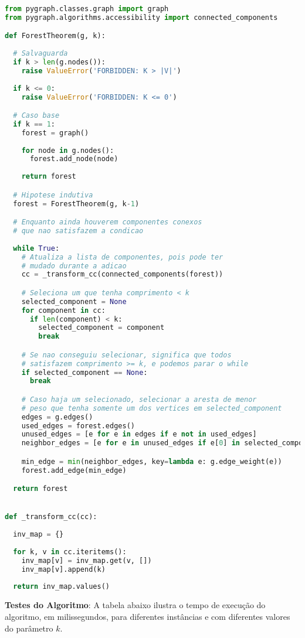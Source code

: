 \documentclass[paper=a4, fontsize=11pt]{scrartcl} %
\numberwithin{equation}{section} %
\numberwithin{figure}{section} %
\numberwithin{table}{section} %
\begin{document}
\begin{lstlisting}[language=Python, caption=Python algorithm]
from pygraph.classes.graph import graph
from pygraph.algorithms.accessibility import connected_components

def ForestTheorem(g, k):
  
  # Salvaguarda
  if k > len(g.nodes()):
    raise ValueError('FORBIDDEN: K > |V|')
  
  if k <= 0:
    raise ValueError('FORBIDDEN: K <= 0')

  # Caso base
  if k == 1:
    forest = graph()
  
    for node in g.nodes():
      forest.add_node(node)
  
    return forest

  # Hipotese indutiva
  forest = ForestTheorem(g, k-1)

  # Enquanto ainda houverem componentes conexos
  # que nao satisfazem a condicao
  
  while True:
    # Atualiza a lista de componentes, pois pode ter
    # mudado durante a adicao
    cc = _transform_cc(connected_components(forest))

    # Seleciona um que tenha comprimento < k
    selected_component = None
    for component in cc:
      if len(component) < k:
        selected_component = component
        break

    # Se nao conseguiu selecionar, significa que todos
    # satisfazem comprimento >= k, e podemos parar o while
    if selected_component == None:
      break

    # Caso haja um selecionado, selecionar a aresta de menor
    # peso que tenha somente um dos vertices em selected_component
    edges = g.edges()
    used_edges = forest.edges()
    unused_edges = [e for e in edges if e not in used_edges]
    neighbor_edges = [e for e in unused_edges if e[0] in selected_component]

    min_edge = min(neighbor_edges, key=lambda e: g.edge_weight(e))
    forest.add_edge(min_edge)

  return forest


def _transform_cc(cc):
  
  inv_map = {}
  
  for k, v in cc.iteritems():
    inv_map[v] = inv_map.get(v, [])
    inv_map[v].append(k)
  
  return inv_map.values()
\end{lstlisting}

\textbf{Testes do Algoritmo}: A tabela abaixo ilustra o tempo de execução do algoritmo, em milissegundos, para diferentes instâncias e com diferentes valores do parâmetro $k$. 
\end{document}

